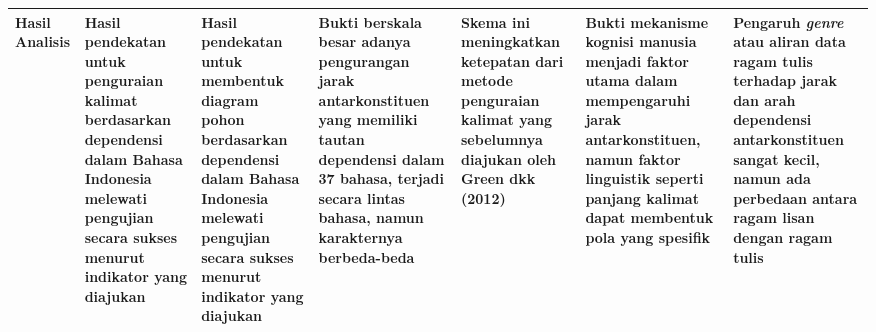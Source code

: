 \begin{landscape}
\begin{table}[htbp]
\begin{scriptsize}
\begin{center}
\begin{tabular}{| p{2cm} | p{3cm} | p{3cm} | p{3cm} | p{3cm} | p{3cm} | p{3cm} |}
Hasil Analisis & Hasil pendekatan untuk penguraian kalimat berdasarkan dependensi dalam Bahasa Indonesia melewati pengujian secara sukses menurut indikator yang diajukan & Hasil pendekatan untuk membentuk diagram pohon berdasarkan dependensi dalam Bahasa Indonesia melewati pengujian secara sukses menurut indikator yang diajukan & Bukti berskala besar adanya pengurangan jarak antarkonstituen yang memiliki tautan dependensi dalam 37 bahasa, terjadi secara lintas bahasa, namun karakternya berbeda-beda & Skema ini meningkatkan ketepatan dari metode penguraian kalimat yang sebelumnya diajukan oleh Green dkk (2012) & Bukti mekanisme kognisi manusia menjadi faktor utama dalam mempengaruhi jarak antarkonstituen, namun faktor linguistik seperti panjang kalimat dapat membentuk pola yang spesifik & Pengaruh \textit{genre} atau aliran data ragam tulis terhadap jarak dan arah dependensi antarkonstituen sangat kecil, namun ada perbedaan antara ragam lisan dengan ragam tulis \\ \hline

\end{tabular}
\end{center}
\end{scriptsize}
\end{table} 
\end{landscape}
\pagestyle{plain}


